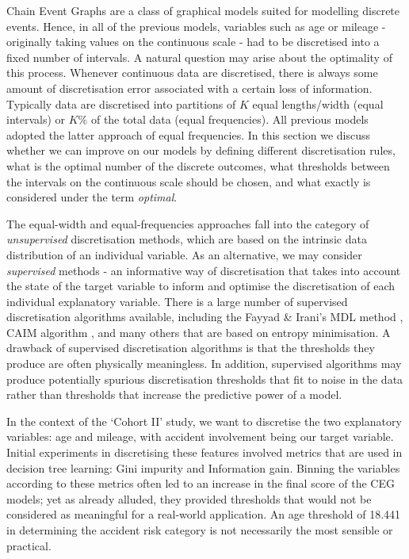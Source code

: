 \documentclass[runningheads]{llncs}
\begin{document}
Chain Event Graphs are a class of graphical models suited for modelling discrete events. Hence, in all of the previous models, variables such as age or mileage - originally taking values on the continuous scale - had to be discretised into a fixed number of intervals. A natural question may arise about the optimality of this process. Whenever continuous data are discretised, there is always some amount of discretisation error associated with a certain loss of information. Typically data are discretised into partitions of $K$ equal lengths/width (equal intervals) or $K\%$ of the total data (equal frequencies). All previous models adopted the latter approach of equal frequencies. In this section we discuss whether we can improve on our models by defining different discretisation rules, what is the optimal number of the discrete outcomes, what thresholds between the intervals on the continuous scale should be chosen, and what exactly is considered under the term \emph{optimal}.

The equal-width and equal-frequencies approaches fall into the category of \emph{unsupervised} discretisation methods, which are based on the intrinsic data distribution of an individual variable. As an alternative, we may consider \emph{supervised} methods - an informative way of discretisation that takes into account the state of the target variable to inform and optimise the discretisation of each individual explanatory variable. There is a large number of supervised discretisation algorithms available, including the Fayyad \& Irani's MDL method \cite{fayyad1993discretization}, CAIM algorithm \cite{kurgan2004caim}, and many others that are based on entropy minimisation. A drawback of supervised discretisation algorithms is that the thresholds they produce are often physically meaningless. In addition, supervised algorithms may produce potentially spurious discretisation thresholds that fit to noise in the data rather than thresholds that increase the predictive power of a model. 

In the context of the `Cohort II' study, we want to discretise the two explanatory variables: age and mileage, with accident involvement being our target variable. Initial experiments in discretising these features involved metrics that are used in decision tree learning: Gini impurity and Information gain. Binning the variables according to these metrics often led to an increase in the final score of the CEG models; yet as already alluded, they provided thresholds that would not be considered as meaningful for a real-world application. An age threshold of 18.441 in determining the accident risk category is not necessarily the most sensible or practical.
\end{document}

